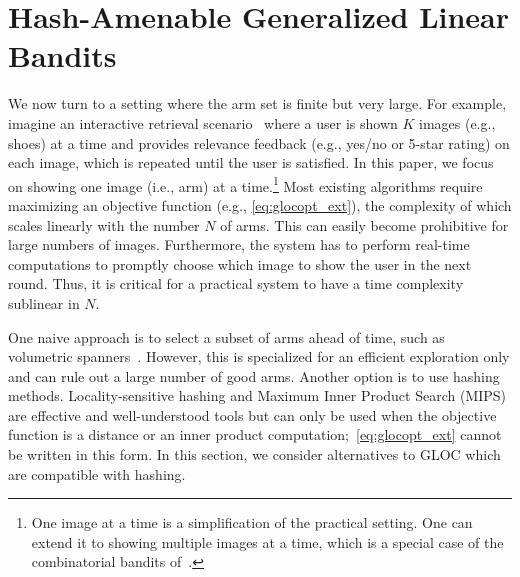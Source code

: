 \vspace{-04pt}
\section{Hash-Amenable Generalized Linear Bandits}
\label{sec:hashing}
\vspace{-4pt}

We now turn to a setting where the arm set is finite but very large.
For example, imagine an interactive retrieval scenario~\cite{rui98relevance,konyushkova13content,glowacka15balancing} where a user is shown $K$ images (e.g., shoes) at a time and provides relevance feedback (e.g., yes/no or 5-star rating) on each image, which is repeated until the user is satisfied.
In this paper, we focus on showing one image (i.e., arm) at a time.\footnote{
  One image at a time is a simplification of the practical setting.
  One can extend it to showing multiple images at a time, which is a special case of the combinatorial bandits of~\citet{qin14contextual}.
}
Most existing algorithms require maximizing an objective function (e.g., \eqref{eq:glocopt_ext}), the complexity of which scales linearly with the number $N$ of arms. 
This can easily become prohibitive for large numbers of images.
Furthermore, the system has to perform real-time computations to promptly choose which image to show the user in the next round.
Thus, it is critical for a practical system to have a time complexity sublinear in $N$.

One naive approach is to select a subset of arms ahead of time, such as volumetric spanners~\cite{hazan16volumetric}.
However, this is specialized for an efficient exploration only and can rule out a large number of good arms.
Another option is to use hashing methods.
Locality-sensitive hashing and Maximum Inner Product Search (MIPS) are effective and well-understood tools but can only be used when the objective function is a distance or an inner product computation;~\eqref{eq:glocopt_ext} cannot be written in this form.
In this section, we consider alternatives to GLOC which are compatible with hashing.


